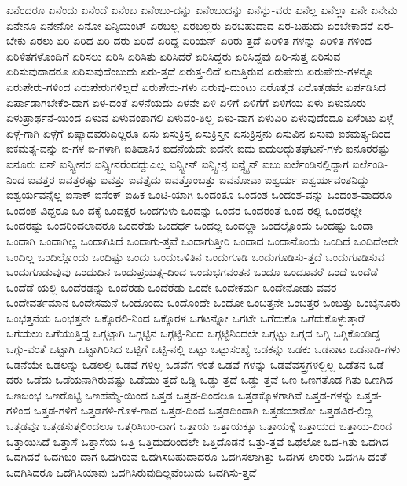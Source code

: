 {ಏನೆಂದರೂ
ಏನೆಂದು
ಏನೆಂದೆ
ಏನೆಂಬ
ಏನೆಂಬು-ದನ್ನು
ಏನೆಂಬುದನ್ನು
ಏನೆನ್ನು-ವರು
ಏನೆಲ್ಲ
ಏನೆಲ್ಲಾ
ಏನೇ
ಏನೇನು
ಏನೇನೂ
ಏನೇನೋ
ಏನೋ
ಏನ್ಶಿಯಂಟ್
ಏರಬಲ್ಲ
ಏರಬಲ್ಲರು
ಏರಬಹುದಾದ
ಏರ-ಬಹುದು
ಏರಬೇಕಾದರೆ
ಏರ-ಬೇಕು
ಏರಲು
ಏರಿ
ಏರಿದ
ಏರಿ-ದರು
ಏರಿದೆ
ಏರಿದ್ದ
ಏರಿಯನ್
ಏರಿರು-ತ್ತದೆ
ಏರಿಳಿತ-ಗಳನ್ನು
ಏರಿಳಿತ-ಗಳಿಂದ
ಏರಿಳಿತಗಳೊಂದಿಗೆ
ಏರಿಸಲು
ಏರಿಸಿ
ಏರಿಸಿತು
ಏರಿಸಿದರೆ
ಏರಿಸಿದ್ದರು
ಏರಿಸಿದ್ದವು
ಏರಿ-ಸುತ್ತ
ಏರಿಸುವ
ಏರಿಸುವುದಾದರೂ
ಏರಿಸುವುದೆಂಬುದು
ಏರು-ತ್ತದೆ
ಏರುತ್ತ-ಲಿದೆ
ಏರುತ್ತಿರುವ
ಏರುಪೇರು
ಏರುಪೇರು-ಗಳನ್ನೂ
ಏರುಪೇರು-ಗಳಿಂದ
ಏರುಪೇರುಗಳಿಲ್ಲದೆ
ಏರುಪೇರು-ಗಳು
ಏರುವು-ದುಂಟು
ಏರೊತ್ತಡ
ಏರೊತ್ತಡವೇ
ಏರ್ಪಡಿಸಿದ
ಏರ್ಪಾಡಾಗಬೇಕೆಂ-ದಾಗ
ಏಳ-ದಂತೆ
ಏಳನೆಯದು
ಏಳನೇ
ಏಳಿ
ಏಳಿಗೆ
ಏಳಿಗೆಗೆ
ಏಳಿಗೆಯ
ಏಳು
ಏಳುನೂರು
ಏಳುಪ್ರಾರ್ಥನೆ-ಯಿಂದ
ಏಳುವ
ಏಳುವಂತಾಗಲಿ
ಏಳುವಂ-ತಿಲ್ಲ
ಏಳು-ವಾಗ
ಏಳುವಿರಿ
ಏಳುವುದೆಂದೂ
ಏಳೆಂಟು
ಏಳ್ಗೆ
ಏಳ್ಗೆ-ಗಾಗಿ
ಏಳ್ಗೆಗೆ
ಏಷ್ಯಾದವರುಎಲ್ಲರೂ
ಏಸು
ಏಸುಕ್ರಿಸ್ತ
ಏಸುಕ್ರಿಸ್ತನ
ಏಸುಕ್ರಿಸ್ತನು
ಏಸುವಿನ
ಏಸುವು
ಐಕಮತ್ಯ-ದಿಂದ
ಐಕಮತ್ಯ-ವನ್ನು
ಐ-ಗಳ
ಐ-ಗಳಾಗಿ
ಐತಿಹಾಸಿಕ
ಐದನೆಯದೇ
ಐದನೇ
ಐದು
ಐದುಅದ್ಭುತಘಟನೆ-ಗಳು
ಐನೂರರಷ್ಟು
ಐನೂರು
ಐನ್
ಐನ್ಸ್ಟೀನರ
ಐನ್ಸ್ಟೀನರೆಂದದ್ದುಎಲ್ಲ
ಐನ್ಸ್ಟೀನ್
ಐನ್ಸ್ಟೀನ್ರ
ಐನ್ಸ್ಟೈನ್
ಐಬು
ಐರ್ಲೆಂಡಿನಲ್ಲಿದ್ದಾಗ
ಐರ್ಲೆಂಡಿ-ನಿಂದ
ಐವತ್ತರ
ಐವತ್ತರಷ್ಟು
ಐವತ್ತು
ಐವತ್ತೈದು
ಐವತ್ತೊಂಬತ್ತು
ಐವನೋವಾ
ಐಶ್ವರ್ಯ
ಐಶ್ವರ್ಯವಂತನಿದ್ದು
ಐಶ್ವರ್ಯವನ್ನೆಲ್ಲ
ಐಸಾಕ್
ಐಸೆಂಕ್
ಐಹಿಕ
ಒಂಟಿ-ಯಾಗಿ
ಒಂದಂತೂ
ಒಂದಂಶ
ಒಂದಂಶ-ವನ್ನು
ಒಂದಂಶ-ವಾದರೂ
ಒಂದಂಶ-ವಿದ್ದರೂ
ಒಂ-ದಕ್ಕೆ
ಒಂದಕ್ಷರ
ಒಂದಗುಳು
ಒಂದನ್ನು
ಒಂದರ
ಒಂದರಂತೆ
ಒಂದ-ರಲ್ಲಿ
ಒಂದರಲ್ಲೇ
ಒಂದರಷ್ಟು
ಒಂದರಿಂದಲಾದರೂ
ಒಂದರೆಡು
ಒಂದರ್ಧ
ಒಂದಲ್ಲ
ಒಂದಲ್ಲಾ
ಒಂದಲ್ಲೊಂದು
ಒಂದಷ್ಟು
ಒಂದಾ
ಒಂದಾಗಿ
ಒಂದಾಗಿಲ್ಲ
ಒಂದಾಗಿಸಿದೆ
ಒಂದಾಗು-ತ್ತವೆ
ಒಂದಾಗುತ್ತೀರಿ
ಒಂದಾದ
ಒಂದಾನೊಂದು
ಒಂದಿದೆ
ಒಂದಿದೆಅದೇ
ಒಂದಿಲ್ಲ
ಒಂದಿಲ್ಲೊಂದು
ಒಂದಿಷ್ಟು
ಒಂದು
ಒಂದುಒಳಿತಿನ
ಒಂದುಗೂಡಿ
ಒಂದುಗೂಡಿಸು-ತ್ತದೆ
ಒಂದುಗೂಡಿಸುವ
ಒಂದುಗೂಡುವುವು
ಒಂದುದಿನ
ಒಂದುಪ್ರಯತ್ನ-ದಿಂದ
ಒಂದುಭಗವಂತನ
ಒಂದೂ
ಒಂದೂವರೆ
ಒಂದೆ
ಒಂದೆಡೆ
ಒಂದೆಡೆ-ಯಲ್ಲಿ
ಒಂದೆರಡನ್ನು
ಒಂದೆರಡು
ಒಂದೆರೆಡು
ಒಂದೇ
ಒಂದೇಕರ್ಮ
ಒಂದೇನೋಡು-ವವರ
ಒಂದೇವರ್ತಮಾನ
ಒಂದೇಸಮನೆ
ಒಂದೊಂದು
ಒಂದೊಂದೇ
ಒಂದೋ
ಒಂಬತ್ತನೇ
ಒಂಬತ್ತರ
ಒಂಬತ್ತು
ಒಂಬೈನೂರು
ಒಂಭತ್ತನೆಯ
ಒಂಭತ್ತನೇ
ಒಕ್ಕೊರಲಿ-ನಿಂದ
ಒಕ್ಕೊರಳ
ಒಗಟನ್ನೋ
ಒಗಟೇ
ಒಗೆದುಕೊ
ಒಗೆದುಕೊಳ್ಳುತ್ತಾರೆ
ಒಗೆಯಲು
ಒಗೆಯುತ್ತಿದ್ದ
ಒಗ್ಗಟ್ಟಾಗಿ
ಒಗ್ಗಟ್ಟಿನ
ಒಗ್ಗಟ್ಟಿ-ನಿಂದ
ಒಗ್ಗಟ್ಟಿನಿಂದಲೇ
ಒಗ್ಗಟ್ಟು
ಒಗ್ಗದ
ಒಗ್ಗಿ
ಒಗ್ಗಿಕೊಂಡಿದ್ದ
ಒಗ್ಗು-ವಂತೆ
ಒಟ್ಟಾಗಿ
ಒಟ್ಟಾಗಿರಿಸಿದ
ಒಟ್ಟಿಗೆ
ಒಟ್ಟಿ-ನಲ್ಲಿ
ಒಟ್ಟು
ಒಟ್ಟುಸಂಖ್ಯೆ
ಒಡಕನ್ನು
ಒಡಕು
ಒಡನಾಟ
ಒಡನಾಡಿ-ಗಳು
ಒಡನೆಯೇ
ಒಡಲನ್ನು
ಒಡಲಲ್ಲಿ
ಒಡವೆ-ಗಳಿಲ್ಲ
ಒಡವೆಗ-ಳಂತೆ
ಒಡವೆ-ಗಳನ್ನು
ಒಡವೆವಸ್ತ್ರಗಳಲ್ಲಿಲ್ಲ
ಒಡೆತನ
ಒಡೆ-ದರು
ಒಡೆದು
ಒಡೆಯನಾಗಿರುವಷ್ಟು
ಒಡೆಯು-ತ್ತದೆ
ಒಡ್ಡಿ
ಒಡ್ಡು-ತ್ತದೆ
ಒಡ್ಡು-ತ್ತವೆ
ಒಣ
ಒಣಗತೊಡ-ಗಿತು
ಒಣಗಿದ
ಒಣಜಂಭ
ಒಣರೊಟ್ಟಿ
ಒಣಹೆಮ್ಮೆ-ಯಿಂದ
ಒತ್ತಡ
ಒತ್ತಡ-ದಿಂದಲೂ
ಒತ್ತಡಕ್ಕೊಳಗಾಗಿವೆ
ಒತ್ತಡ-ಗಳನ್ನು
ಒತ್ತಡ-ಗಳಿಂದ
ಒತ್ತಡ-ಗಳಿಗೆ
ಒತ್ತಡಗಳಿ-ಗೊಳ-ಗಾದ
ಒತ್ತಡ-ದಿಂದ
ಒತ್ತಡದಿಂದಾಗಿ
ಒತ್ತಡಯಾರೋ
ಒತ್ತಡವಿರ-ಲಿಲ್ಲ
ಒತ್ತಡವೂ
ಒತ್ತಡಸುತ್ತಲಿಂದಲೂ
ಒತ್ತರಿಸಿಬಂ-ದಾಗ
ಒತ್ತಾಯ
ಒತ್ತಾಯಕ್ಕೂ
ಒತ್ತಾಯಕ್ಕೆ
ಒತ್ತಾಯದ
ಒತ್ತಾಯ-ದಿಂದ
ಒತ್ತಾಯಿಸಿದೆ
ಒತ್ತಾಸೆ
ಒತ್ತಾಸೆಯ
ಒತ್ತಿ
ಒತ್ತಿದುದರಿಂದಲೇ
ಒತ್ತಿದೊಡನೆ
ಒತ್ತು-ತ್ತವೆ
ಒಥೆಲೋ
ಒದ-ಗಿತು
ಒದಗಿದ
ಒದಗಿದರೆ
ಒದಗಿಬಂ-ದಾಗ
ಒದಗಿರುವ
ಒದಗಿಸಬಹುದಾದರೂ
ಒದಗಿಸಲಾಗಿತ್ತು
ಒದಗಿಸ-ಲಾರರು
ಒದಗಿಸಿ-ದಂತೆ
ಒದಗಿಸಿದರೂ
ಒದಗಿಸಿಯಾವು
ಒದಗಿಸಿರುವುದಿಲ್ಲವೆಂಬುದು
ಒದಗಿಸು-ತ್ತವೆ
}
